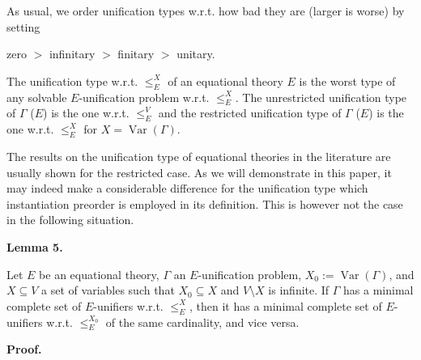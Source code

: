  
 
As usual, we order unification types w.r.t. how bad they are (larger is worse) by setting\par
 
zero $>$ infinitary $>$ finitary $>$ unitary.\par
 
The unification type w.r.t. $\leq_{E}^{X}$ of an equational theory $E$ is the worst type of any solvable $E$-unification problem w.r.t. $\leq_{E}^{X}$. The unrestricted unification type of $\Gamma$ ($E$) is the one w.r.t. $\leq_{E}^{V}$ and the restricted unification type of $\Gamma$ ($E$) is the one w.r.t. $\leq_{E}^{X}$ for $X=\operatorname{Var}(\Gamma)$.\par
 
 
 
The results on the unification type of equational theories in the literature are usually shown for the restricted case. As we will demonstrate in this paper, it may indeed make a considerable difference for the unification type which instantiation preorder is employed in its definition. This is however not the case in the following situation.\par
 
 
 
\par\medskip\noindent\textbf{Lemma 5.}\par
 
 
Let $E$ be an equational theory, $\Gamma$ an $E$-unification problem, $X_{0}:=\operatorname{Var}(\Gamma)$, and $X\subseteq V$ a set of variables such that $X_{0}\subseteq X$ and $V\setminus X$ is infinite. If $\Gamma$ has a minimal complete set of $E$-unifiers w.r.t. $\leq_{E}^{X}$, then it has a minimal complete set of $E$-unifiers w.r.t. $\leq_{E}^{X_{0}}$ of the same cardinality, and vice versa.\par
 
 
 
 
 
\par\medskip\noindent\textbf{Proof.}\par
 
